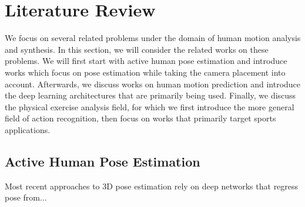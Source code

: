 %
%
%
%
%

\chapter{Literature Review}
We focus on several related problems under the domain of human motion analysis and synthesis. In this section, we will consider the related works on these problems. We will first start with active human pose estimation and introduce works which focus on pose estimation while taking the camera placement into account. Afterwards, we discuss works on human motion prediction and introduce the deep learning architectures that are primarily being used. Finally, we discuss the physical exercise analysis field, for which we first introduce the more general field of action recognition, then focus on works that primarily target sports applications.

\section{Active Human Pose Estimation}
Most recent approaches to 3D pose estimation rely on deep networks that regress pose from...
